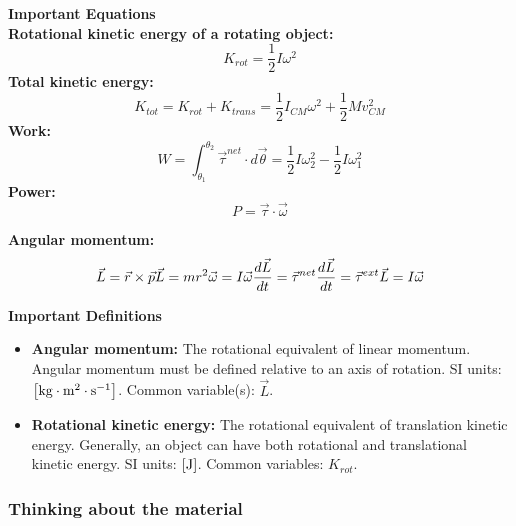 \begin{framed}
\textbf{Important Equations}\\
\textbf{Rotational kinetic energy of a rotating object:}
\begin{equation}
K_{rot} = \frac{1}{2}I\omega^2
\end{equation}
\textbf{Total kinetic energy:}
\begin{equation}
K_{tot} = K_{rot} + K_{trans} = \frac{1}{2}I_{CM}\omega^2+ \frac{1}{2}Mv_{CM}^2
\end{equation}
\textbf{Work:}
\begin{equation}
W = \int_{\theta_1}^{\theta_2}\vec \tau^{net}\cdot d\vec \theta = \frac{1}{2}I\omega_2^2 -\frac{1}{2}I\omega_1^2
\end{equation}
\textbf{Power:}
\begin{equation}
P = \vec \tau \cdot \vec \omega
\end{equation}

\textbf{Angular momentum:}
\begin{equation}
\vec L = \vec r \times \vec p\\
\vec L = mr^2\vec\omega = I\vec\omega\\
\frac{d\vec L}{dt}=\vec\tau^{net}\\
\frac{d\vec L}{dt}=\vec\tau^{ext}\\
\vec L = I\vec \omega\\
\end{equation}
\end{framed}

\begin{framed}
\textbf{Important Definitions}\\
\begin{itemize}
\item \textbf{Angular momentum:} The rotational equivalent of linear momentum. Angular momentum must be defined relative to an axis of rotation. SI units: ${\rm \left[{kg\cdot m^2\cdot s^{ -1}}\right]}$. Common variable(s): $\vec L$.
\item \textbf{Rotational kinetic energy:} The rotational equivalent of translation kinetic energy. Generally, an object can have both rotational and translational kinetic energy.  SI units: ${\rm \left[{J}\right]}$. Common variables: $K_{rot}$.
\end{itemize}
\end{framed}

\subsubsection{Thinking about the material}

